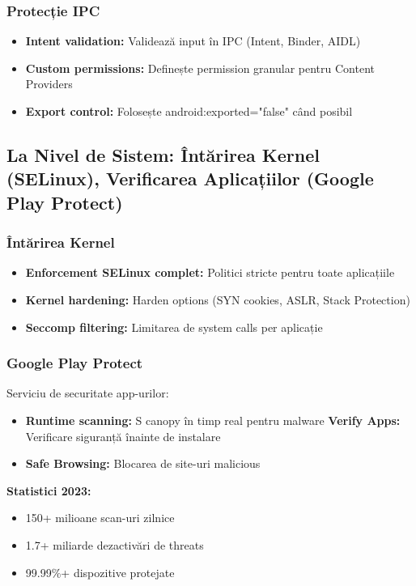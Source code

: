 \documentclass[11pt,a4paper,twocolumn]{article}
\theoremstyle{definition}
\theoremstyle{plain}
\theoremstyle{remark}
\begin{document}
\subsubsection{Protecție IPC}
\begin{itemize}
    \item \textbf{Intent validation:} Validează input în IPC (Intent, Binder, AIDL)
    \item \textbf{Custom permissions:} Definește permission granular pentru Content Providers
    \item \textbf{Export control:} Folosește android:exported="false" când posibil
\end{itemize}

\subsection{La Nivel de Sistem: Întărirea Kernel (SELinux), Verificarea Aplicațiilor (Google Play Protect)}

\subsubsection{Întărirea Kernel}
\begin{itemize}
    \item \textbf{Enforcement SELinux complet:} Politici stricte pentru toate aplicațiile
    \item \textbf{Kernel hardening:} Harden options (SYN cookies, ASLR, Stack Protection)
    \item \textbf{Seccomp filtering:} Limitarea de system calls per aplicație
\end{itemize}

\subsubsection{Google Play Protect}
Serviciu de securitate app-urilor:
\begin{itemize}
    \item \textbf{Runtime scanning:} S canopy în timp real pentru malware
    \textbf{Verify Apps:} Verificare siguranță înainte de instalare
    \item \textbf{Safe Browsing:} Blocarea de site-uri malicious
\end{itemize}

\textbf{Statistici 2023:}
\begin{itemize}
    \item 150+ milioane scan-uri zilnice
    \item 1.7+ miliarde dezactivări de threats
    \item 99.99\%+ dispozitive protejate
\end{itemize}
\end{document}
